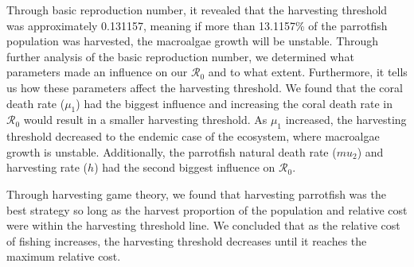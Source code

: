 \documentclass[12pt]{article}
\begin{document}
Through basic reproduction number, it revealed that the harvesting threshold was approximately 0.131157, meaning if more than 13.1157\% of the parrotfish population was harvested, the macroalgae growth will be unstable. Through further analysis of the basic reproduction number, we determined what parameters made an influence on our $\mathscr{R}_{0}$ and to what extent. Furthermore, it tells us how these parameters affect the harvesting threshold. We found that the coral death rate ($\mu_{1}$) had the biggest influence and increasing the coral death rate in $\mathscr{R}_{0}$ would result in a smaller harvesting threshold. As $\mu_{1}$ increased, the harvesting threshold decreased to the endemic case of the ecosystem, where macroalgae growth is unstable. Additionally, the parrotfish natural death rate ($mu_{2}$) and harvesting rate ($h$) had the second biggest influence on $\mathscr{R}_{0}$.

Through harvesting game theory, we found that harvesting parrotfish was the best strategy so long as the harvest proportion of the population and relative cost were within the harvesting threshold line. We concluded that as the relative cost of fishing increases, the harvesting threshold decreases until it reaches the maximum relative cost.
\end{document}

